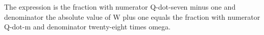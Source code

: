 The expression is the fraction with numerator Q-dot-seven minus one and denominator the absolute value of W plus one equals the fraction with numerator Q-dot-m and denominator twenty-eight times omega.
